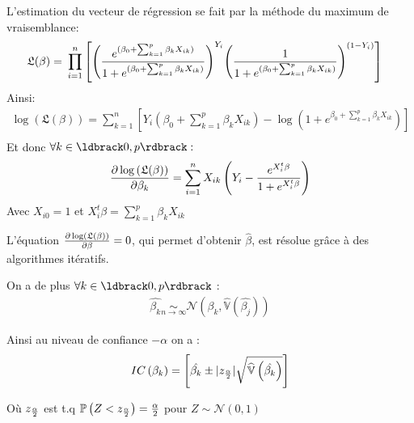 \documentclass{book}
\begin{document}
\noindent
L'estimation du vecteur de régression se fait par la méthode du maximum de vraisemblance:
\begin{align*}
\mathfrak{L}(\beta) =& ~ \prod_{i=1}^n \left[
{\left(  {{e^{(\beta_0 + \sum_{k=1}^p {\beta_k X_{ik}})}} \over {1+{e^{(\beta_0 + \sum_{k=1}^p {\beta_k X_{ik}})}}}  } \right)}^{Y_i} {\left( 1 \over {1+ {e^{(\beta_0 + \sum_{k=1}^p {\beta_k X_{ik}})}}}   \right)}^{(1-Y_i)} \right]
\end{align*}
Ainsi: 
\begin{align*}
\log \left( \mathfrak{L}(\beta) \right)  = 
\sum_{k=1}^n {\left[ Y_i \left( \beta_0 + \sum_{k=1}^p {\beta_k X_{ik}}  \right) 
- \log \left( 1 + e^{\beta_0 +  \sum_{k=1}^p {\beta_k X_{ik}}  } \right)
\right]} \\
\end{align*}
Et donc $ \forall k \in \ldbrack 0,p \rdbrack :  $
\begin{align*}
{{\partial  \log \left( \mathfrak{L}(\beta) \right)} \over {\partial \beta_k} }= 
\sum_{i=1}^n {X_{ik} \left( Y_i - {{e^{X_i^t \beta}} \over {1+ e^{X_i^t \beta}}} \right)}
\end{align*}
Avec $X_{i0} = 1 $ et $ X_i^t \beta = \sum_{k = 1}^p {\beta_k X_{ik}} $

\bigskip

\noindent
L'équation $ {{\partial  \log \left( \mathfrak{L}(\beta) \right)} \over {\partial \beta} } = 0  $, qui permet d'obtenir $\hat{\beta}$, est résolue grâce à des algorithmes itératifs.\\

\bigskip

\noindent
On a de plus $\forall k \in \ldbrack 0,p \rdbrack$ :
\begin{align*}
\hat{\beta_k} \underset{n \rightarrow \infty}{\sim} \mathcal{N} \left( \beta_k,\widehat{\mathbb{V}} \left(  \hat{\beta_j}\right) \right)
\end{align*}

\bigskip

\noindent
Ainsi au niveau de confiance $-\alpha$ on a :
\begin{align*}
IC \left( \beta_k \right) =
 \left[
  \hat{\beta_k} \pm |z_{{\alpha} \over {2}}| \sqrt{\widehat{\mathbb{V}}\left( \hat{\beta_k} \right)}
\right]\\
\end{align*}

\noindent
Où $ z_{ {\alpha} \over {2}} $ est t.q $ \mathbb{P}\left( Z <  z_{ {\alpha} \over {2}} \right) = {{\alpha} \over {2}}$ pour $ Z \sim \mathcal{N}(0,1) $
\end{document}
